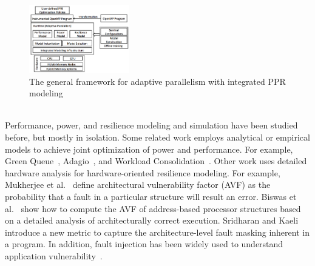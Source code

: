 \documentclass{article}  %
\begin{document}

\begin{figure}
\begin{center}
\includegraphics[width=0.39\textwidth]{figures/general_framework.png}
\end{center}
\caption{The general framework for adaptive parallelism with integrated PPR modeling}
\label{fig:general_framework}
\end{figure}

\vspace{10pt}

   \\
Performance, power, and resilience modeling and simulation have been
studied before, but mostly in isolation. Some related work employs
analytical or empirical models to achieve joint optimization of power
and performance. For example, Green 
Queue~\cite{sdscpower_hppac12, sdscpower_ccpe12, sdscpower_cgc12},  
Adagio~\cite{rountree_sc07, rountree_ics09}, and Workload
Consolidation~\cite{taskconsolidation_ipdps10,   gpusolidation_srmpds11}. 
Other work uses detailed hardware analysis for hardware-oriented resilience 
modeling. For example, Mukherjee et al.~\cite{avf_micro03} define 
architectural vulnerability factor (AVF) as the probability that a
fault in a particular structure will result an error. 
Biswas et al.~\cite{avf_isca05} show how to compute the AVF of address-based
processor structures based on a detailed analysis of architecturally
correct execution. Sridharan and Kaeli~\cite{pvf_selse10, pvf_hpca09}
introduce a new metric to capture the architecture-level fault masking
inherent in a program. In addition, fault injection has been
widely used to understand application 
vulnerability~\cite{li:2012:classifying, multigrid_ics12, fj_asplos12, fj_dns12, lanl_fi_europar11}.
\end{document}
